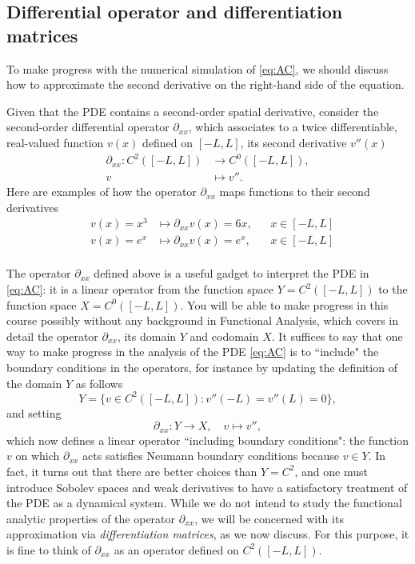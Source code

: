\documentclass[a4paper]{siamart220329}
\theoremstyle{plain}
\begin{document}
\subsection{Differential operator and differentiation matrices} To make progress with the numerical simulation of
\cref{eq:AC}, we should discuss how to approximate the second derivative on the
right-hand side of the equation. 

Given that the PDE contains a second-order spatial derivative, consider the second-order differential operator $\partial_{xx}$, which associates to
a twice differentiable, real-valued function $v(x)$ defined on $[-L,L]$, its second
derivative $v''(x)$
\[
  \begin{aligned}
    \partial_{xx} \colon  C^2([-L,L]) & \to C^0([-L,L]), \\
                       v           & \mapsto v''.
  \end{aligned}
\]
Here are examples of how the operator $\partial_{x x}$ maps functions to their
second derivatives
\[
  \begin{aligned}
  & v(x) = x^3 & \mapsto \partial_{xx} v(x) = 6 x, & & x \in [-L,L] \\
  & v(x) = e^x & \mapsto \partial_{xx} v(x) = e^x, & & x \in [-L,L] \\
  \end{aligned}
\]

The operator $\partial_{x x}$ defined above is a useful gadget to interpret the PDE
in \cref{eq:AC}: it is a linear operator from the function space $Y = C^2([-L,L])$
to the function space $X = C^0([-L,L])$. You will be able to make progress in this
course possibly without any background in Functional Analysis, which covers in detail the
operator $\partial_{xx}$, its domain $Y$ and codomain $X$. It suffices to say that
one way to make progress in the analysis of the PDE \cref{eq:AC} is to ``include" the
boundary conditions in the operators, for instance by updating the definition of the
domain $Y$
as follows
\[
  Y = \{ v \in C^2([-L,L]) \colon v''(-L) = v''(L) = 0 \},
\]
and setting
\begin{equation}\label{eq:dxx}
  \partial_{xx} \colon  Y \to X, \quad v \mapsto v'',
\end{equation}
which now defines a linear operator ``including boundary conditions": the function
$v$ on which $\partial_{xx}$ acts satisfies Neumann boundary conditions because $v
\in Y$. In fact, it turns out that there are better choices than $Y= C^2$, and one
must introduce Sobolev spaces and weak derivatives to have a satisfactory treatment
of the PDE as a dynamical system. While we do not
intend to study the functional analytic properties of the operator $\partial_{x x}$,
we will be concerned with its approximation via \textit{differentiation matrices}, as
we now discuss. For this purpose, it is fine to think of $\partial_{xx}$ as an
operator defined on $C^2([-L,L])$.
\end{document}
